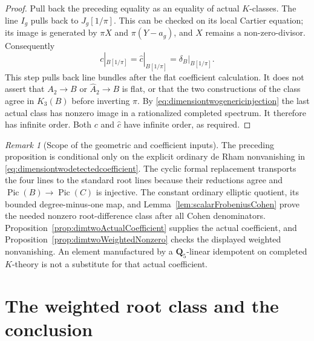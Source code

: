 \documentclass[11pt,a4paper]{article}
\theoremstyle{remark}
\newtheorem{remark}[theorem]{Remark}
\begin{document}
\begin{proof}
Pull back the preceding equality as an equality of actual
$K$-classes. The line $I_g$ pulls back to $J_g[1/\pi]$.
This can be checked on its local Cartier equation; its image is
generated by $\pi X$ and $\pi(Y-a_g)$, and $X$ remains a
non-zero-divisor. Consequently
\[
 c|_{B[1/\pi]}=\widehat c|_{B[1/\pi]}
       =\delta_B|_{B[1/\pi]}.
\]
This step pulls back line bundles after the flat coefficient
calculation. It does not assert that $A_2\to B$ or
$\widehat A_2\to B$ is flat, or that the two constructions of
the class agree in $K_3(B)$ before inverting $\pi$.
By \eqref{eq:dimensiontwogenericinjection} the last actual class
has nonzero image in a rationalized completed spectrum. It
therefore has infinite order. Both $c$ and $\widehat c$ have
infinite order, as required.
\end{proof}

\begin{remark}[Scope of the geometric and coefficient inputs]
The preceding proposition is conditional only on the explicit
ordinary de Rham nonvanishing in
\eqref{eq:dimensiontwodetectedcoefficient}. The cyclic formal
replacement transports the four lines to the standard root
lines because their reductions agree and $\operatorname{Pic}(B)
\to\operatorname{Pic}(C)$ is injective. The constant ordinary
elliptic quotient, its bounded degree-minus-one map, and
Lemma~\ref{lem:scalarFrobeniusCohen} prove the needed nonzero
root-difference class after all Cohen denominators. Proposition~\ref{prop:dimtwoActualCoefficient} supplies the actual coefficient, and Proposition~\ref{prop:dimtwoWeightedNonzero} checks the displayed weighted nonvanishing. An element manufactured by a $\mathbf Q_5$-linear
idempotent on completed $K$-theory is not a substitute for
that actual coefficient.
\end{remark}



\section{The weighted root class and the conclusion}
\label{sec:dimtwoWeightedConclusion}
\end{document}
